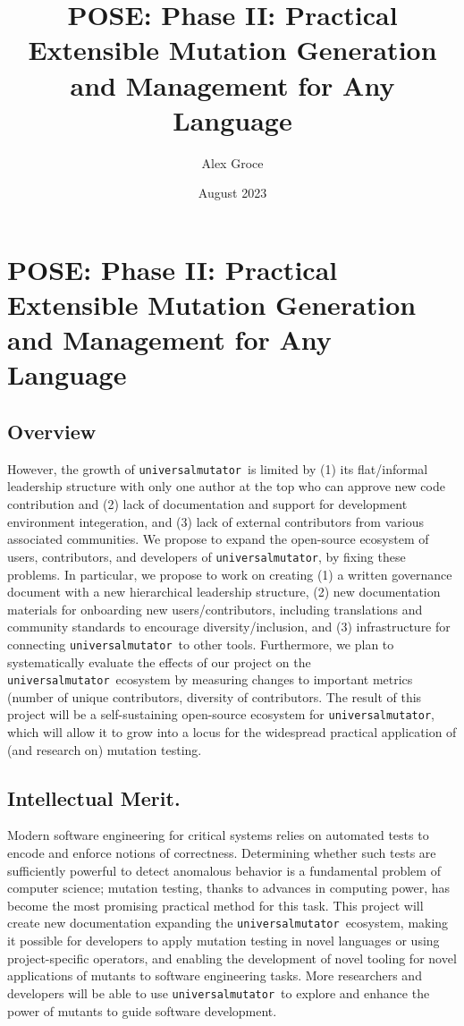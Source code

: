 \documentclass[numbers]{proposalnsf}
\title{POSE: Phase II: Practical Extensible Mutation Generation and Management for Any Language}
\author{Alex Groce }
\date{August 2023}
\newcommand{\um}{\texttt{universalmutator}}
\begin{document}
\section*{POSE: Phase II: Practical Extensible Mutation Generation and Management for Any Language}

\subsection*{Overview}
\vspace{-2mm}

However, the growth of \um\ is limited by (1) its flat/informal leadership structure with only one author at the top who can approve new code contribution and (2) lack of documentation and support for development environment integeration, and (3) lack of external contributors from various associated communities.
We propose to expand the open-source ecosystem of users, contributors, and developers of \um, by fixing these problems.
In particular, we propose to work on creating (1) a written governance document with a new hierarchical leadership structure, (2) new documentation materials for onboarding new users/contributors, including translations and community standards to encourage diversity/inclusion, and (3) infrastructure for connecting \um\ to other tools.
Furthermore, we plan to systematically evaluate the effects of our project on the \um\ ecosystem by measuring changes to important metrics (number of unique contributors, diversity of contributors. 
The result of this project will be a self-sustaining open-source ecosystem for \um, which will allow it to grow into a locus for the widespread practical application of (and research on) mutation testing.

\subsection*{Intellectual Merit.} 
\vspace{-2mm}
Modern software engineering for critical systems relies on automated tests to encode and enforce notions of correctness.  Determining whether such tests are sufficiently powerful to detect anomalous behavior is a fundamental problem of computer science; mutation testing, thanks to advances in computing power, has become the most promising practical method for this task.  This project will create new documentation expanding the \um\ ecosystem, making it possible for developers to apply mutation testing in novel languages or using project-specific operators, and enabling the development of novel tooling for novel applications of mutants to software engineering tasks.  More researchers and developers will be able to use \um\ to explore and enhance the power of mutants to guide software development.
\end{document}
